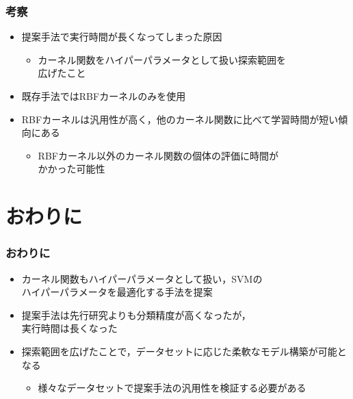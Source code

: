\documentclass[11pt,dvipdfmx,cjk]{beamer}
\begin{document}
\begin{frame}
  \frametitle{考察}
  \begin{itemize}
    \item 提案手法で実行時間が長くなってしまった原因
    \begin{itemize}
      \item  カーネル関数をハイパーパラメータとして扱い探索範囲を\\広げたこと
    \end{itemize}
    \item 既存手法ではRBFカーネルのみを使用
    \item RBFカーネルは汎用性が高く，他のカーネル関数に比べて学習時間が短い傾向にある
    \begin{itemize}
      \item RBFカーネル以外のカーネル関数の個体の評価に時間が\\かかった可能性
    \end{itemize}
  \end{itemize}
\end{frame}
\section{おわりに}
\begin{frame}
  \frametitle{おわりに}
  \begin{itemize}
    \item カーネル関数もハイパーパラメータとして扱い，SVMの\\ハイパーパラメータを最適化する手法を提案
  \item 提案手法は先行研究よりも分類精度が高くなったが，\\実行時間は長くなった
  \item 探索範囲を広げたことで，データセットに応じた柔軟なモデル構築が可能となる
   \begin{itemize}
  \item 様々なデータセットで提案手法の汎用性を検証する必要がある
\end{itemize}
  \end{itemize}
\end{frame}
  
\end{document}
